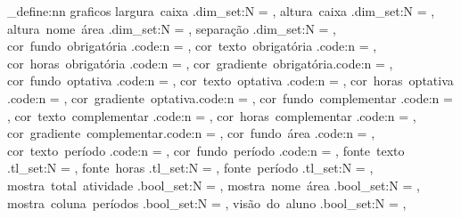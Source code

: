 

\RequirePackage{etoolbox}
\RequirePackage{tikz}
\usetikzlibrary{calc, positioning, fit}

\ifdeflength{\ppc@BaselineSkip}{}{
    \newlength{\ppc@BaselineSkip}
    \setlength{\ppc@BaselineSkip}{\baselineskip}
}


\ExplSyntaxOn
\keys_define:nn { graficos } {
    largura~caixa .dim_set:N = \ppc@LarguraCaixaAtividade,
    altura~caixa .dim_set:N = \ppc@AlturaCaixaAtividade,
    altura~nome~área .dim_set:N = \ppc@AlturaNomeArea,
    separação .dim_set:N = \ppc@SeparacaoCaixasAtividade,
    cor~fundo~obrigatória .code:n = {},
    cor~texto~obrigatória .code:n = {},
    cor~horas~obrigatória .code:n = {},
    cor~gradiente~obrigatória.code:n = {},
    cor~fundo~optativa .code:n = {},
    cor~texto~optativa .code:n = {},
    cor~horas~optativa .code:n = {},
    cor~gradiente~optativa.code:n = {},
    cor~fundo~complementar .code:n = {},
    cor~texto~complementar .code:n = {},
    cor~horas~complementar .code:n = {},
    cor~gradiente~complementar.code:n = {},
    cor~fundo~área .code:n = {},
    cor~texto~período .code:n = {},
    cor~fundo~período .code:n = {},
    fonte~texto .tl_set:N = \ppc@FonteTexto,
    fonte~horas .tl_set:N = \ppc@FonteHoras,
    fonte~período .tl_set:N = \ppc@FontePeriodo,
    mostra~total~atividade .bool_set:N = \ppc@MostraTotal,
    mostra~nome~área .bool_set:N = \ppc@MostraNomeArea,
    mostra~coluna~períodos .bool_set:N = \ppc@MostraColunaPeriodos,
    visão~do~aluno .bool_set:N = \ppc@VisaoDoAluno,
}
\ExplSyntaxOff


